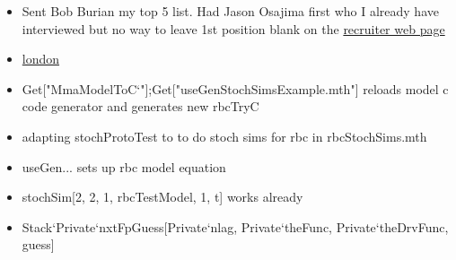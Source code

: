 \documentclass[hyperref]{labbook}
\begin{document}
  \begin{itemize}
  \item Sent Bob Burian my top 5 list.  Had Jason Osajima first who I already  have interviewed  but no way to leave 1st position blank on the  \href{https://fweb.rsma.frb.gov/add/intern_recruiting_2017/cgi-bin/recruiter_view.pl}{recruiter web page }
  \end{itemize}

 \begin{itemize}
 \item \href{https://careers.google.com/jobs#!t=jo&jid=/google/quantitative-analyst-1-13-st-giles-high-st-london-uk-2518841243&}{london}
 \end{itemize}











\begin{itemize}
\item Get["MmaModelToC`"];Get["useGenStochSimsExample.mth"] reloads model c code generator and generates new rbcTryC
\item adapting stochProtoTest to  to do stoch sims for rbc in rbcStochSims.mth
\item useGen...  sets up rbc model equation
\item stochSim[2, 2, 1, rbcTestModel, 1, t] works already
\item Stack`Private`nxtFpGuess[Private`nlag, Private`theFunc, Private`theDrvFunc, guess]
\end{itemize}




\end{document}
